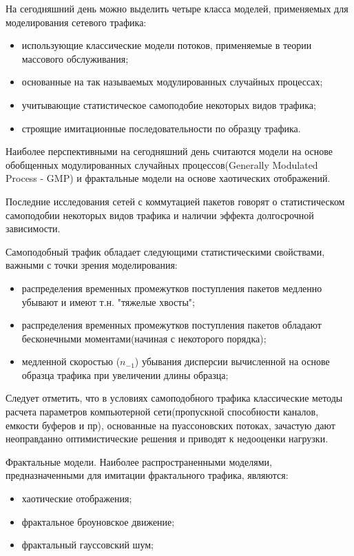 \documentclass[12pt]{report}
\begin{document}
    На сегодняшний день можно выделить четыре класса моделей, применяемых для моделирования сетевого трафика:
    \begin{itemize}
        \item использующие классические модели потоков, применяемые в теории массового обслуживания;
        \item основанные на так называемых модулированных случайных процессах;
        \item учитывающие статистическое самоподобие некоторых видов трафика;
        \item строящие имитационные последовательности по образцу трафика.
    \end{itemize}

    Наиболее перспективными на сегодняшний день считаются модели на основе обобщенных модулированных случайных процессов(Generally Modulated Process - GMP) и фрактальные модели на основе хаотических отображений.

    Последние исследования сетей с коммутацией пакетов говорят о статистическом самоподобии некоторых видов трафика и наличии эффекта долгосрочной зависимости.

    Самоподобный трафик обладает следующими статистическими свойствами, важными с точки зрения моделирования:
    \begin{itemize}
        \item распределения временных промежутков поступления пакетов медленно убывают и имеют т.н. "тяжелые хвосты";
        \item распределения временных промежутков поступления пакетов обладают бесконечными моментами(начиная с некоторого порядка);
        \item медленной скоростью ($n_{-1}$) убывания дисперсии вычисленной на основе образца трафика при увеличении длины образца;
    \end{itemize}

    Следует отметить, что в условиях самоподобного трафика классические методы расчета параметров компьютерной сети(пропускной способности каналов, емкости буферов и пр), основанные на пуассоновских потоках, зачастую дают неоправданно оптимистические решения и приводят к недооценки нагрузки.

    Фрактальные модели. Наиболее распространенными моделями, предназначенными для имитации фрактального трафика, являются:

    \begin{itemize}
        \item хаотические отображения;
        \item фрактальное броуновское движение;
        \item фрактальный гауссовский шум;
    \end{itemize}
\end{document}

